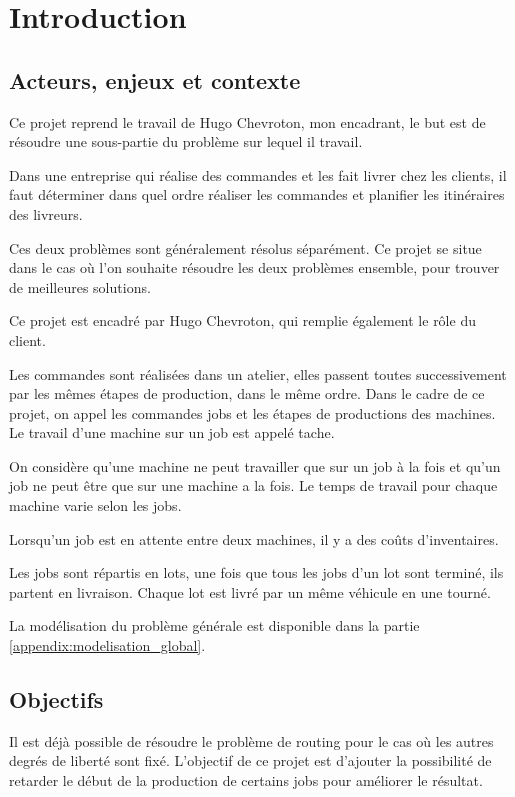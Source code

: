 \chapter{Introduction}

\section{Acteurs, enjeux et contexte}
Ce projet reprend le travail de Hugo Chevroton, mon encadrant, le but est de résoudre une sous-partie du problème sur lequel il travail.

Dans une entreprise qui réalise des commandes et les fait livrer chez les clients, il faut déterminer dans quel ordre réaliser les commandes et planifier les itinéraires des livreurs.

Ces deux problèmes sont généralement résolus séparément.
Ce projet se situe dans le cas où l'on souhaite résoudre les deux problèmes ensemble, pour trouver de meilleures solutions.

Ce projet est encadré par Hugo Chevroton, qui remplie également le rôle du client.

Les commandes sont réalisées dans un atelier, elles passent toutes successivement par les mêmes étapes de production, dans le même ordre.
Dans le cadre de ce projet, on appel les commandes jobs et les étapes de productions des machines.
Le travail d'une machine sur un job est appelé tache.

On considère qu'une machine ne peut travailler que sur un job à la fois et qu'un job ne peut être que sur une machine a la fois.
Le temps de travail pour chaque machine varie selon les jobs.

Lorsqu'un job est en attente entre deux machines, il y a des coûts d'inventaires.

Les jobs sont répartis en lots, une fois que tous les jobs d'un lot sont terminé, ils partent en livraison.
Chaque lot est livré par un même véhicule en une tourné.

La modélisation du problème générale est disponible dans la partie \autoref{appendix:modelisation_global}.

\section{Objectifs}
Il est déjà possible de résoudre le problème de routing pour le cas où les autres degrés de liberté sont fixé.
L'objectif de ce projet est d'ajouter la possibilité de retarder le début de la production de certains jobs pour améliorer le résultat.

